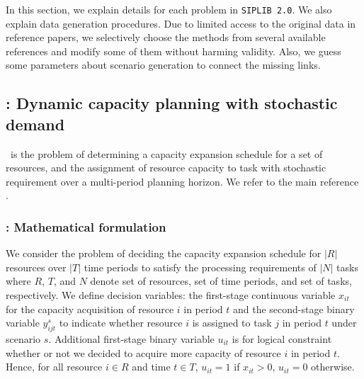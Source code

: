 In this section, we explain details for each problem in \texttt{SIPLIB 2.0}. We also explain data generation procedures. Due to limited access to the original data in reference papers, we selectively choose the methods from several available references and modify some of them without harming validity. Also, we guess some parameters about scenario generation to connect the missing links.  %

\subsection{\dcap: Dynamic capacity planning with stochastic demand} \label{DCAP}
\dcap\ is the problem of determining a capacity expansion schedule for a set of resources, and the assignment of resource capacity to task with stochastic requirement over a multi-period planning horizon. %
We refer to the main reference \cite{journal:AG2004}.
\subsubsection{\dcap: Mathematical formulation}
We consider the problem of deciding the capacity expansion schedule for $|R|$ resources over $|T|$ time periods to satisfy the processing requirements of $|N|$ tasks where $R$, $T$, and $N$ denote set of resources, set of time periods, and set of tasks, respectively. We define decision variables: the first-stage continuous variable $x_{it}$ for the capacity acquisition of resource $i$ in period $t$ and the second-stage binary variable $y_{ijt}^s$ to indicate whether resource $i$ is assigned to task $j$ in period $t$ under scenario $s$. Additional first-stage binary variable $u_{it}$ is for logical constraint whether or not we decided to acquire more capacity of resource $i$ in period $t$. Hence, for all resource $i\in R$ and time $t\in T$, $u_{it}=1$ if $x_{it}>0$, $u_{it}=0$ otherwise. 

